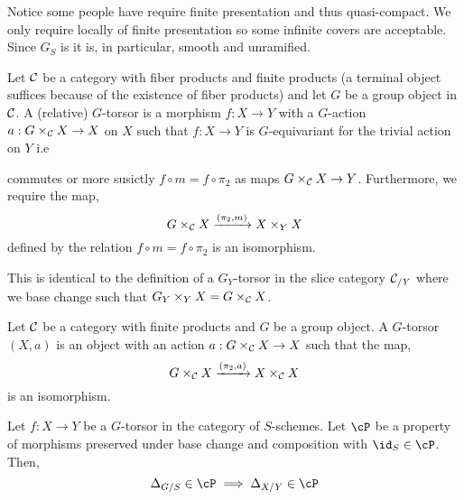 \documentclass[12pt]{article}
\begin{document}
\begin{rmk}
Notice some people have \etale require finite presentation and thus quasi-compact. We only require locally of finite presentation so some infinite covers are acceptable. Since $G_S$ is \etale it is, in particular, smooth and unramified.
\end{rmk}

\begin{defn}
Let $\mathcal{C}$ be a category with fiber products and finite products (a terminal object suffices because of the existence of fiber products) and let $G$ be a group object in $\mathcal{C}$. A (relative) $G$-torsor is a morphism $f : X \to Y$ with a $G$-action $a : G \times_{\mathcal{C}} X \to X$ on $X$ such that $f : X \to Y$ is $G$-equivariant for the trivial action on $Y$ i.e
\begin{center}
\end{center}
commutes or more susictly $f \circ m = f \circ \pi_2$ as maps $G \times_{\mathcal{C}} X \to Y$. Furthermore, we require the map,
\[ G \times_{\mathcal{C}} X \xrightarrow{(\pi_2, m)} X \times_Y X \]
defined by the relation $f \circ m = f \circ \pi_2$ is an isomorphism.
\end{defn}

\begin{rmk}
This is identical to the definition of a $G_Y$-torsor in the slice category $\mathcal{C}_{/Y}$ where we base change such that $G_Y \times_Y X = G \times_{\mathcal{C}} X$.
\end{rmk}

\begin{defn}
Let $\mathcal{C}$ be a category with finite products and $G$ be a group object. A $G$-torsor $(X, a)$ is an object with an action $a : G \times_{\mathcal{C}} X \to X$ such that the map,
\[ G \times_{\mathcal{C}} X \xrightarrow{(\pi_2, a)} X \times_{\mathcal{C}} X \] 
is an isomorphism. 
\end{defn}

\begin{prop}
Let $f : X \to Y$ be a $G$-torsor in the category of $S$-schemes. Let $\cP$ be a property of morphisms preserved under base change and composition with $\id_S \in \cP$. Then,
\[ \Delta_{G/S} \in \cP \implies \Delta_{X/Y} \in \cP \]
\end{prop}
\end{document}
